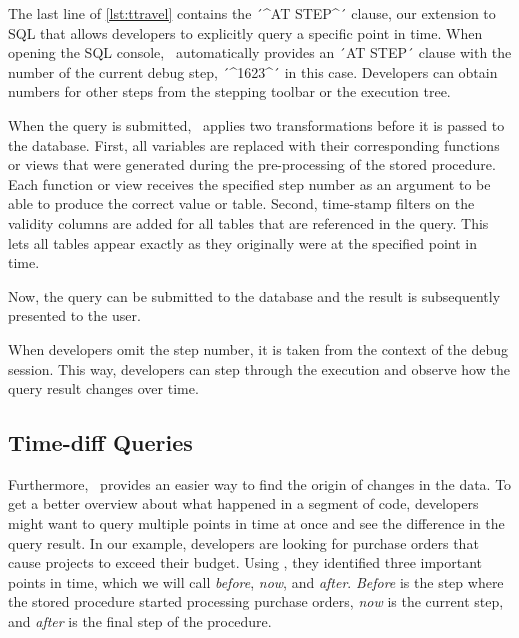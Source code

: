 The last line of \cref{lst:ttravel} contains the ´^AT STEP^´ clause, our extension to SQL that allows developers to explicitly query a specific point in time.
When opening the SQL console, \tool\ automatically provides an ´AT STEP´ clause with the number of the current debug step, ´^1623^´ in this case.
Developers can obtain numbers for other steps from the stepping toolbar or the execution tree. 

When the query is submitted, \tool\ applies two transformations before it is passed to the database.
First, all variables are replaced with their corresponding functions or views that were generated during the pre-processing of the stored procedure.
Each function or view receives the specified step number as an argument to be able to produce the correct value or table.
Second, time-stamp filters on the validity columns are added for all tables that are referenced in the query. 
This lets all tables appear exactly as they originally were at the specified point in time.


Now, the query can be submitted to the database and the result is subsequently presented to the user.

When developers omit the step number, it is taken from the context of the debug session.
This way, developers can step through the execution and observe how the query result changes over time.

\subsection{Time-diff Queries}

Furthermore, \SQLextension\ provides an easier way to find the origin of changes in the data.
To get a better overview about what happened in a segment of code, developers might want to query multiple points in time at once and see the difference in the query result.
In our example, developers are looking for purchase orders that cause projects to exceed their budget.
Using \tool, they identified three important points in time, which we will call \emph{before}, \emph{now}, and \emph{after}.
\emph{Before} is the step where the stored procedure started processing purchase orders, \emph{now} is the current step, and \emph{after} is the final step of the procedure.

